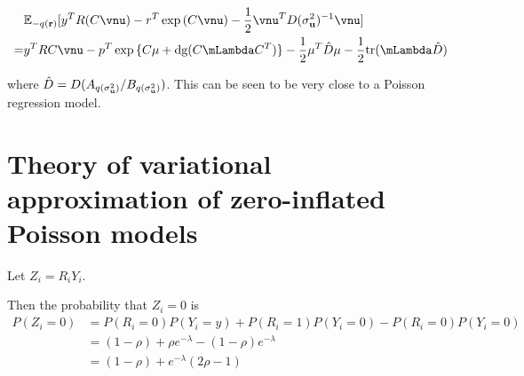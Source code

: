 \documentclass{amsart}
\begin{document}
\begin{align*}
&\bbE_{-q(\vr)} [y^TR(C\vnu) - r^T\exp{(C\vnu)}-\half \vnu^T D(\sigma_{\vu}^2)^{-1} \vnu]\\
=&y^TRC \vnu - p^T \exp{\{C \mu + \text{dg}(C \mLambda C^T)\}} - \half \mu^T \hat{D} \mu - \half \text{tr}(\mLambda \hat{D})
\end{align*}

where $\hat{D} = D(A_{q(\sigma_{\bf u}^2)} / B_{q(\sigma_{\bf u}^2)})$. This can be seen to be very close to a Poisson
regression model.

\section{Theory of variational approximation of zero-inflated Poisson models}
Let $Z_i = R_i Y_i$.

Then the probability that $Z_i = 0$ is
\begin{align*}
P(Z_i = 0) &= P(R_i = 0)P(Y_i = y) + P(R_i = 1) P(Y_i = 0) - P(R_i = 0) P(Y_i = 0) \\
&= (1 - \rho) + \rho e^{-\lambda} - (1 - \rho) e^{-\lambda} \\
&= (1 - \rho) + e^{-\lambda}(2 \rho - 1)
\end{align*}



\end{document}
